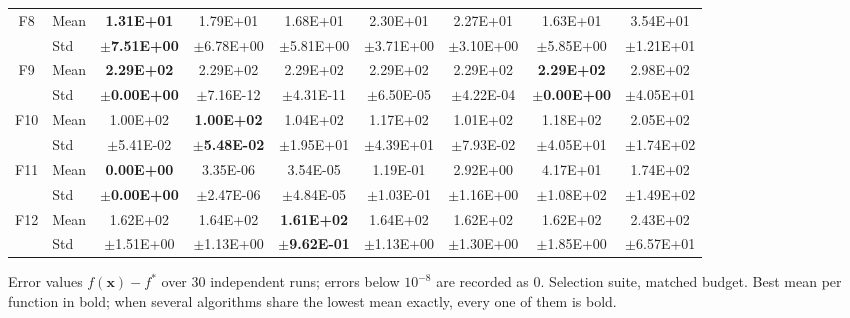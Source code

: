 \begin{table}[htbp]
{\begin{tabular}{clccccccc}
F8 & Mean & \textbf{1.31E+01} & 1.79E+01 & 1.68E+01 & 2.30E+01 & 2.27E+01 & 1.63E+01 & 3.54E+01 \\
 & Std & $\pm$\textbf{7.51E+00} & $\pm$6.78E+00 & $\pm$5.81E+00 & $\pm$3.71E+00 & $\pm$3.10E+00 & $\pm$5.85E+00 & $\pm$1.21E+01 \\
F9 & Mean & \textbf{2.29E+02} & 2.29E+02 & 2.29E+02 & 2.29E+02 & 2.29E+02 & \textbf{2.29E+02} & 2.98E+02 \\
 & Std & $\pm$\textbf{0.00E+00} & $\pm$7.16E-12 & $\pm$4.31E-11 & $\pm$6.50E-05 & $\pm$4.22E-04 & $\pm$\textbf{0.00E+00} & $\pm$4.05E+01 \\
F10 & Mean & 1.00E+02 & \textbf{1.00E+02} & 1.04E+02 & 1.17E+02 & 1.01E+02 & 1.18E+02 & 2.05E+02 \\
 & Std & $\pm$5.41E-02 & $\pm$\textbf{5.48E-02} & $\pm$1.95E+01 & $\pm$4.39E+01 & $\pm$7.93E-02 & $\pm$4.05E+01 & $\pm$1.74E+02 \\
F11 & Mean & \textbf{0.00E+00} & 3.35E-06 & 3.54E-05 & 1.19E-01 & 2.92E+00 & 4.17E+01 & 1.74E+02 \\
 & Std & $\pm$\textbf{0.00E+00} & $\pm$2.47E-06 & $\pm$4.84E-05 & $\pm$1.03E-01 & $\pm$1.16E+00 & $\pm$1.08E+02 & $\pm$1.49E+02 \\
F12 & Mean & 1.62E+02 & 1.64E+02 & \textbf{1.61E+02} & 1.64E+02 & 1.62E+02 & 1.62E+02 & 2.43E+02 \\
 & Std & $\pm$1.51E+00 & $\pm$1.13E+00 & $\pm$\textbf{9.62E-01} & $\pm$1.13E+00 & $\pm$1.30E+00 & $\pm$1.85E+00 & $\pm$6.57E+01 \\
\bottomrule
\end{tabular}}
\begin{flushleft}\footnotesize
Error values $f(\mathbf{x})-f^{*}$ over 30 independent runs; errors below $10^{-8}$ are recorded as 0. Selection suite, matched budget. Best mean per function in bold; when several algorithms share the lowest mean exactly, every one of them is bold.
\end{flushleft}
\end{table}
